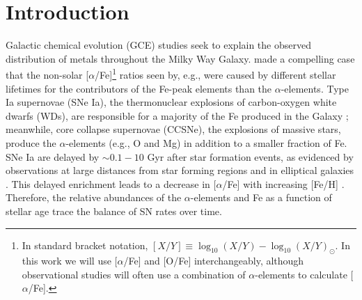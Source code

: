 \documentclass[twocolumn,twocolappendix,linenumbers,trackchanges]{aastex631}
\newcommand{\aFe}{[$\alpha$/Fe]\xspace}
\begin{document}
\section{Introduction}

Galactic chemical evolution (GCE) studies seek to explain the observed distribution of metals throughout the Milky Way Galaxy. \citet{Tinsley1979-StellarLifetimes} made a compelling case that the non-solar \aFe\footnote{
    In standard bracket notation, $[X/Y]\equiv \log_{10}(X/Y) - \log_{10}(X/Y)_{\odot}$. In this work we will use \aFe and [O/Fe] interchangeably, although observational studies will often use a combination of $\alpha$-elements to calculate \aFe.
} ratios seen by, e.g., \citet{Wallerstein1962-GDwarfAbundances} were caused by different stellar lifetimes for the contributors of the Fe-peak elements than the $\alpha$-elements. 
Type Ia supernovae (SNe Ia), the thermonuclear explosions of carbon-oxygen white dwarfs (WDs), are responsible for a majority of the Fe produced in the Galaxy \citep{Matteucci1986-SupernovaEnrichment}; meanwhile, core collapse supernovae (CCSNe), the explosions of massive stars, produce the $\alpha$-elements (e.g., O and Mg) in addition to a smaller fraction of Fe.
SNe Ia are delayed by $\sim0.1-10$ Gyr after star formation events, as evidenced by observations at large distances from star forming regions and in elliptical galaxies \citep[e.g.,][]{Maza1976-SNStatistics}.
This delayed enrichment leads to a decrease in \aFe with increasing [Fe/H] \citep{Matteucci1986-SupernovaEnrichment}.
Therefore, the relative abundances of the $\alpha$-elements and Fe as a function of stellar age trace the balance of SN rates over time.
\end{document}

